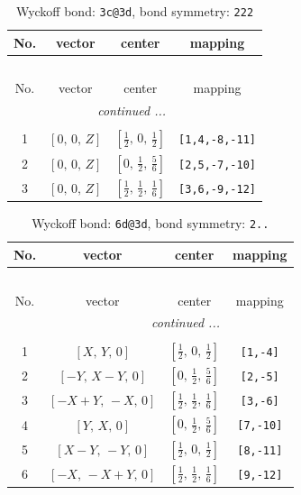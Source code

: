 \documentclass[fleqn,8pt]{jsarticle}
\begin{document}
\renewcommand{\arraystretch}{1.2}
\begin{longtable}{cccc}
\caption{Wyckoff bond: {\tt 3c@3d}, bond symmetry: {\tt 222}}
 \\
 \hline \hline
No. & vector & center & mapping \\ \hline \endfirsthead

\multicolumn{3}{l}{\tablename\ \thetable{}} \\
 \hline \hline
No. & vector & center & mapping \\ \hline \endhead

 \hline \hline
\multicolumn{3}{r}{\footnotesize\it continued ...} \\ \endfoot

 \hline \hline
\multicolumn{3}{r}{} \\ \endlastfoot

1 & $\left[ 0,\, 0,\, Z \right]$ & $\left[ \frac{1}{2},\, 0,\, \frac{1}{2} \right]$ & {\tt [1,4,-8,-11]} \\ \hline
2 & $\left[ 0,\, 0,\, Z \right]$ & $\left[ 0,\, \frac{1}{2},\, \frac{5}{6} \right]$ & {\tt [2,5,-7,-10]} \\ \hline
3 & $\left[ 0,\, 0,\, Z \right]$ & $\left[ \frac{1}{2},\, \frac{1}{2},\, \frac{1}{6} \right]$ & {\tt [3,6,-9,-12]} \\
\end{longtable}
\renewcommand{\arraystretch}{1.2}
\begin{longtable}{cccc}
\caption{Wyckoff bond: {\tt 6d@3d}, bond symmetry: {\tt 2..}}
 \\
 \hline \hline
No. & vector & center & mapping \\ \hline \endfirsthead

\multicolumn{3}{l}{\tablename\ \thetable{}} \\
 \hline \hline
No. & vector & center & mapping \\ \hline \endhead

 \hline \hline
\multicolumn{3}{r}{\footnotesize\it continued ...} \\ \endfoot

 \hline \hline
\multicolumn{3}{r}{} \\ \endlastfoot

1 & $\left[ X,\, Y,\, 0 \right]$ & $\left[ \frac{1}{2},\, 0,\, \frac{1}{2} \right]$ & {\tt [1,-4]} \\ \hline
2 & $\left[ - Y,\, X - Y,\, 0 \right]$ & $\left[ 0,\, \frac{1}{2},\, \frac{5}{6} \right]$ & {\tt [2,-5]} \\ \hline
3 & $\left[ - X + Y,\, - X,\, 0 \right]$ & $\left[ \frac{1}{2},\, \frac{1}{2},\, \frac{1}{6} \right]$ & {\tt [3,-6]} \\ \hline
4 & $\left[ Y,\, X,\, 0 \right]$ & $\left[ 0,\, \frac{1}{2},\, \frac{5}{6} \right]$ & {\tt [7,-10]} \\ \hline
5 & $\left[ X - Y,\, - Y,\, 0 \right]$ & $\left[ \frac{1}{2},\, 0,\, \frac{1}{2} \right]$ & {\tt [8,-11]} \\ \hline
6 & $\left[ - X,\, - X + Y,\, 0 \right]$ & $\left[ \frac{1}{2},\, \frac{1}{2},\, \frac{1}{6} \right]$ & {\tt [9,-12]} \\
\end{longtable}
\end{document}
